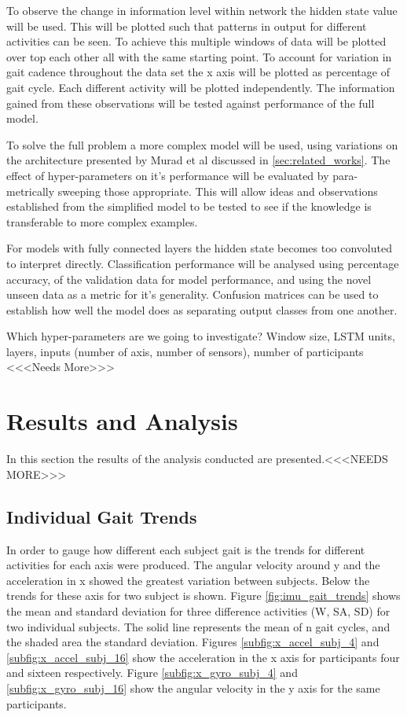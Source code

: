 \documentclass[sensors,article,submit,moreauthors,pdftex]{Definitions/mdpi}
\begin{document}
To observe the change in information level within network the hidden state value will be used. This will be plotted such that patterns in output for different activities can be seen. To achieve this multiple windows of data will be plotted over top each other all with the same starting point. To account for variation in gait cadence throughout the data set the x axis will be plotted as percentage of gait cycle. Each different activity will be plotted independently. The information gained from these observations will be tested against performance of the full model.

To solve the full problem a more complex model will be used, using variations on the architecture presented by Murad et al discussed in \ref{sec:related_works}. The effect of hyper-parameters on it's performance will be evaluated by para-metrically sweeping those appropriate. This will allow ideas and observations established from the simplified model to be tested to see if the knowledge is transferable to more complex examples.

For models with fully connected layers the hidden state becomes too convoluted to interpret directly. Classification performance will be analysed using percentage accuracy, of the validation data for model performance, and using the novel unseen data as a metric for it's generality. Confusion matrices can be used to establish how well the model does as separating output classes from one another.

Which hyper-parameters are we going to investigate? Window size, LSTM units, layers, inputs (number of axis, number of sensors), number of participants <<<Needs More>>>

\section{Results and Analysis}
In this section the results of the analysis conducted are presented.<<<NEEDS MORE>>>

\subsection{Individual Gait Trends}
In order to gauge how different each subject gait is the trends for different activities for each axis were produced. The angular velocity around y and the acceleration in x showed the greatest variation between subjects. Below the trends for these axis for two subject is shown. Figure \ref{fig:imu_gait_trends} shows the mean and standard deviation for three difference activities (W, SA, SD) for two individual subjects. The solid line represents the mean of n gait cycles, and the shaded area the standard deviation. Figures \ref{subfig:x_accel_subj_4} and \ref{subfig:x_accel_subj_16} show the acceleration in the x axis for participants four and sixteen respectively. Figure \ref{subfig:x_gyro_subj_4} and \ref{subfig:x_gyro_subj_16} show the angular velocity in the y axis for the same participants.
\end{document}
